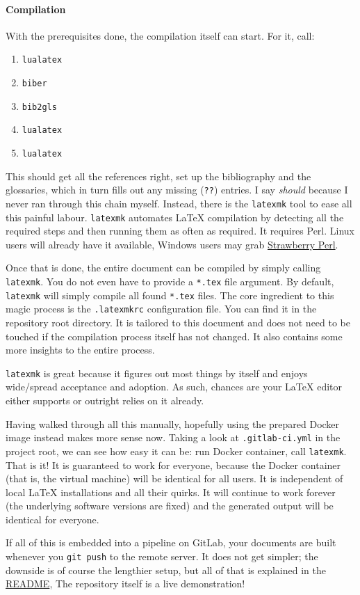 \paragraph{Compilation}
With the prerequisites done, the compilation itself can start.
For it, call:
\begin{enumerate}
    \item \texttt{lualatex}
    \item \texttt{biber}
    \item \texttt{bib2gls}
    \item \texttt{lualatex}
    \item \texttt{lualatex}
\end{enumerate}
This should get all the references right, set up the bibliography and the glossaries,
which in turn fills out any missing (\texttt{??}) entries.
I say \emph{should} because I never ran through this chain myself.
Instead, there is the \texttt{latexmk} tool to ease all this painful labour.
\texttt{latexmk} automates \LaTeX{} compilation by detecting all the required
steps and then running them as often as required.
It requires Perl.
Linux users will already have it available, Windows users may grab
\href{http://strawberryperl.com/}{Strawberry Perl}.

Once that is done, the entire document can be compiled by simply calling
\texttt{latexmk}.
You do not even have to provide a \texttt{*.tex} file argument.
By default, \texttt{latexmk} will simply compile all found \texttt{*.tex} files.
The core ingredient to this magic process is the \texttt{.latexmkrc} configuration file.
You can find it in the repository root directory.
It is tailored to this document and does not need to be touched if the compilation
process itself has not changed.
It also contains some more insights to the entire process.

\texttt{latexmk} is great because it figures out most things by itself and enjoys
wide\-/spread acceptance and adoption.
As such, chances are your \LaTeX{} editor either supports or outright relies on it
already.

Having walked through all this manually, hopefully using the prepared Docker image
instead makes more sense now.
Taking a look at \texttt{.gitlab-ci.yml} in the project root, we can see how easy it
can be:
run Docker container, call \texttt{latexmk}.
That is it!
It is guaranteed to work for everyone, because the Docker container (that is, the
virtual machine) will be identical for all users.
It is independent of local \LaTeX{} installations and all their quirks.
It will continue to work forever (the underlying software versions are fixed) and the
generated output will be identical for everyone.

If all of this is embedded into a pipeline on GitLab, your documents are built whenever
you \texttt{git push} to the remote server.
It does not get simpler; the downside is of course the lengthier setup, but all of that
is explained in the
\href{https://collaborating.tuhh.de/cap7863/latex-git-cookbook/-/blob/master/README.md}{README},
The repository itself is a live demonstration!
